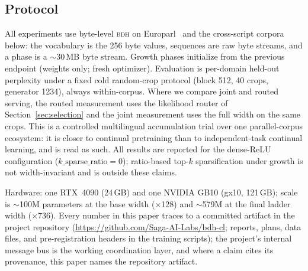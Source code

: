 \documentclass[11pt]{article}
\theoremstyle{definition}\newtheorem{definition}{Definition}
\theoremstyle{remark}\newtheorem{remark}{Remark}
\newcommand{\BDH}{\textsc{bdh}}
\begin{document}
\subsection{Protocol}
\label{sec:protocol}

All experiments use byte-level \BDH{} on Europarl~\cite{europarl} and the cross-script corpora below: the vocabulary is the 256 byte values, sequences are
raw byte streams, and a phase is a $\sim$30\,MB byte stream. Growth phases initialize from
the previous endpoint (weights only; fresh optimizer). Evaluation is per-domain held-out
perplexity under a fixed cold random-crop protocol (block 512, 40 crops, generator 1234),
always within-corpus. Where we compare joint and routed serving, the routed measurement uses
the likelihood router of Section~\ref{sec:selection} and the joint measurement uses the full
width on the same crops. This is a controlled multilingual accumulation trial over one parallel-corpus
ecosystem: it is closer to continual pretraining than to independent-task continual learning, and
is read as such. All results are reported for the dense-ReLU configuration
($k\_\mathrm{sparse\_ratio}=0$); ratio-based top-$k$ sparsification under growth is not width-invariant
and is outside these claims.

Hardware: one RTX~4090 (24\,GB) and one NVIDIA GB10 (gx10, 121\,GB); scale is $\sim$100M
parameters at the base width ($\times$128) and $\sim$579M at the final ladder width
($\times$736). Every number in this paper traces to a committed artifact in the project repository
(\url{https://github.com/Saga-AI-Labs/bdh-cl}; reports, plans, data files, and
pre-registration headers in the training scripts); the project's internal message bus is
the working coordination layer, and where a claim cites its provenance, this paper names
the repository artifact.
\end{document}
